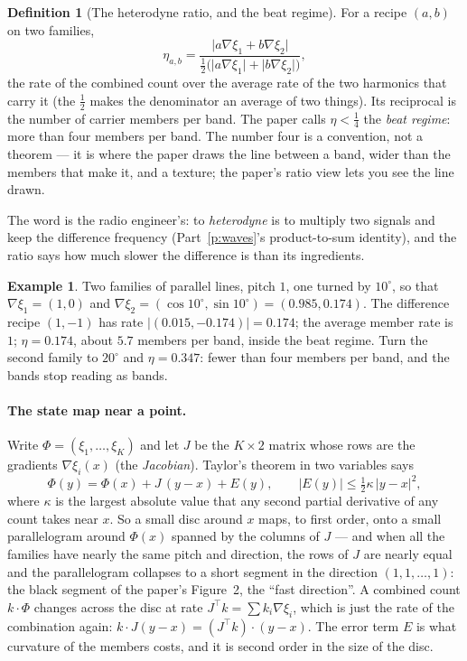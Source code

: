 \documentclass[10pt]{article}
\theoremstyle{plain}
\theoremstyle{definition}
\newtheorem{definition}[fact]{Definition}
\newtheorem{example}[fact]{Example}
\newcommand{\cnt}{\xi}
\newcommand{\het}{\eta}
\begin{document}
\begin{definition}[The heterodyne ratio, and the beat regime]
For a recipe $(a,b)$ on two families,
\[
  \het_{a,b}=\frac{\lvert a\nabla\cnt_1+b\nabla\cnt_2\rvert}
                  {\tfrac12\big(\lvert a\nabla\cnt_1\rvert+\lvert b\nabla\cnt_2\rvert\big)},
\]
the rate of the combined count over the average rate of the two harmonics
that carry it (the $\tfrac12$ makes the denominator an average of two
things). Its reciprocal is the number of carrier members per band. The
paper calls $\het<\tfrac14$ the \emph{beat regime}: more than four members
per band. The number four is a convention, not a theorem --- it is where
the paper draws the line between a band, wider than the members that make
it, and a texture; the paper's ratio view lets you see the line drawn.
\end{definition}

The word is the radio engineer's: to \emph{heterodyne} is to multiply two
signals and keep the difference frequency (Part~\ref{p:waves}'s
product-to-sum identity), and the ratio says how much slower the
difference is than its ingredients.

\begin{example}
Two families of parallel lines, pitch $1$, one turned by $10^\circ$, so
that $\nabla\cnt_1=(1,0)$ and
$\nabla\cnt_2=(\cos10^\circ,\sin10^\circ)=(0.985,0.174)$. The difference
recipe $(1,-1)$ has rate $|(0.015,-0.174)|=0.174$; the average member rate
is $1$; $\het=0.174$, about $5.7$ members per band, inside the beat regime.
Turn the second family to $20^\circ$ and $\het=0.347$: fewer than four
members per band, and the bands stop reading as bands.
\end{example}

\paragraph{The state map near a point.}
Write $\Phi=(\cnt_1,\dots,\cnt_K)$ and let $J$ be the $K\times2$ matrix
whose rows are the gradients $\nabla\cnt_i(x)$ (the \emph{Jacobian}).
Taylor's theorem in two variables says
\[
  \Phi(y)=\Phi(x)+J\,(y-x)+E(y),\qquad |E(y)|\le\tfrac12\kappa\,|y-x|^2,
\]
where $\kappa$ is the largest absolute value that any second partial
derivative of any count takes near $x$. So a small disc around $x$ maps, to
first order, onto a small parallelogram around $\Phi(x)$ spanned by the
columns of $J$ --- and when all the families have nearly the same pitch and
direction, the rows of $J$ are nearly equal and the parallelogram collapses
to a short segment in the direction $(1,1,\dots,1)$: the black segment of
the paper's Figure~2, the ``fast direction''. A combined count $k\cdot\Phi$
changes across the disc at rate $J^{\top}k=\sum k_i\nabla\cnt_i$, which is
just the rate of the combination again: $k\cdot J(y-x)=(J^{\top}k)\cdot(y-x)$.
The error term $E$ is what curvature of the members costs, and it is
second order in the size of the disc.
\end{document}
